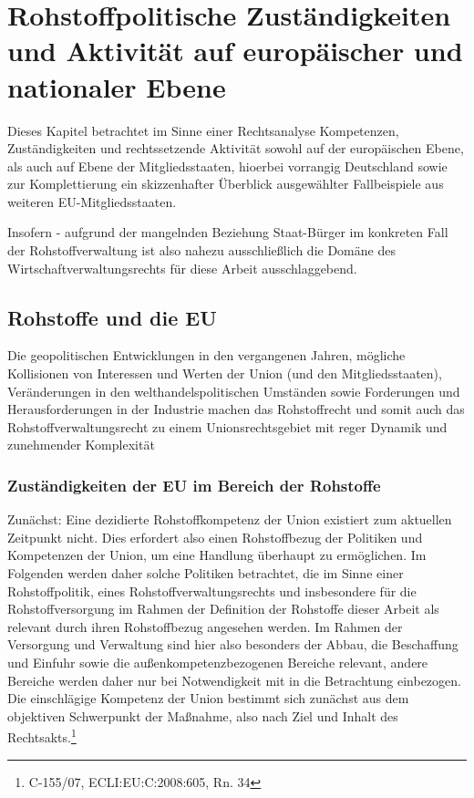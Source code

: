 \documentclass[12pt,a4paper,oneside]{book} %
\begin{document}
	
\chapter{Rohstoffpolitische Zuständigkeiten und Aktivität auf europäischer und nationaler Ebene}

Dieses Kapitel betrachtet im Sinne einer Rechtsanalyse Kompetenzen, Zuständigkeiten und rechtssetzende Aktivität sowohl auf der europäischen Ebene, als auch auf Ebene der Mitgliedsstaaten, hioerbei vorrangig Deutschland sowie zur Komplettierung ein skizzenhafter Überblick ausgewählter Fallbeispiele aus weiteren EU-Mitgliedsstaaten.	
	
	
	Insofern - aufgrund der mangelnden Beziehung Staat-Bürger im konkreten Fall der Rohstoffverwaltung ist also nahezu ausschließlich die Domäne des Wirtschaftverwaltungsrechts für diese Arbeit ausschlaggebend.
	
	\section{Rohstoffe und die EU}
	
	Die geopolitischen Entwicklungen in den vergangenen Jahren, mögliche Kollisionen von Interessen und Werten der Union (und den Mitgliedsstaaten), Veränderungen in den welthandelspolitischen Umständen sowie Forderungen und Herausforderungen in der Industrie machen das Rohstoffrecht und somit auch das Rohstoffverwaltungsrecht zu einem Unionsrechtsgebiet mit reger Dynamik und zunehmender Komplexität
	
	\subsection{Zuständigkeiten der EU im Bereich der Rohstoffe}
	
	Zunächst: Eine dezidierte Rohstoffkompetenz der Union existiert zum aktuellen Zeitpunkt nicht. Dies erfordert also einen Rohstoffbezug der Politiken und Kompetenzen der Union, um eine Handlung überhaupt zu ermöglichen. Im Folgenden werden daher solche Politiken betrachtet, die im Sinne einer Rohstoffpolitik, eines Rohstoffverwaltungsrechts und insbesondere für die Rohstoffversorgung im Rahmen der Definition der Rohstoffe dieser Arbeit als relevant durch ihren Rohstoffbezug angesehen werden. Im Rahmen der Versorgung und Verwaltung sind hier also besonders der Abbau, die Beschaffung und Einfuhr sowie die außenkompetenzbezogenen Bereiche relevant, andere Bereiche werden daher nur bei Notwendigkeit mit in die Betrachtung einbezogen. Die einschlägige Kompetenz der Union bestimmt sich zunächst aus dem objektiven Schwerpunkt der Maßnahme, also nach Ziel und Inhalt des Rechtsakts.\footnote{C-155/07, ECLI:EU:C:2008:605, Rn. 34}
	
\end{document}
